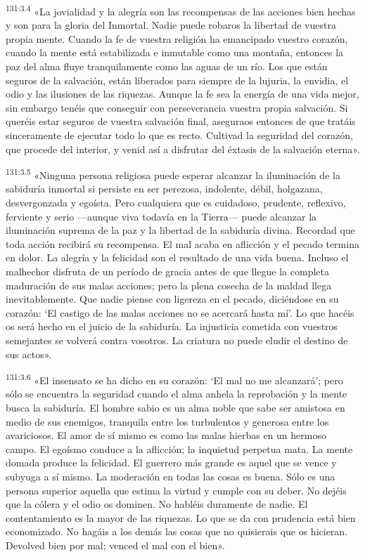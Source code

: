 \par
\textsuperscript{131:3.4} «La jovialidad y la alegría son las recompensas de las acciones bien hechas y son para la gloria del Inmortal. Nadie puede robaros la libertad de vuestra propia mente. Cuando la fe de vuestra religión ha emancipado vuestro corazón, cuando la mente está estabilizada e inmutable como una montaña, entonces la paz del alma fluye tranquilamente como las aguas de un río. Los que están seguros de la salvación, están liberados para siempre de la lujuria, la envidia, el odio y las ilusiones de las riquezas. Aunque la fe sea la energía de una vida mejor, sin embargo tenéis que conseguir con perseverancia vuestra propia salvación. Si queréis estar seguros de vuestra salvación final, aseguraos entonces de que tratáis sinceramente de ejecutar todo lo que es recto. Cultivad la seguridad del corazón, que procede del interior, y venid así a disfrutar del éxtasis de la salvación eterna».

\par
\textsuperscript{131:3.5} «Ninguna persona religiosa puede esperar alcanzar la iluminación de la sabiduría inmortal si persiste en ser perezosa, indolente, débil, holgazana, desvergonzada y egoísta. Pero cualquiera que es cuidadoso, prudente, reflexivo, ferviente y serio ---aunque viva todavía en la Tierra--- puede alcanzar la iluminación suprema de la paz y la libertad de la sabiduría divina. Recordad que toda acción recibirá su recompensa. El mal acaba en aflicción y el pecado termina en dolor. La alegría y la felicidad son el resultado de una vida buena. Incluso el malhechor disfruta de un período de gracia antes de que llegue la completa maduración de sus malas acciones; pero la plena cosecha de la maldad llega inevitablemente. Que nadie piense con ligereza en el pecado, diciéndose en su corazón: `El castigo de las malas acciones no se acercará hasta mí'. Lo que hacéis os será hecho en el juicio de la sabiduría. La injusticia cometida con vuestros semejantes se volverá contra vosotros. La criatura no puede eludir el destino de sus actos».

\par
\textsuperscript{131:3.6} «El insensato se ha dicho en su corazón: `El mal no me alcanzará'; pero sólo se encuentra la seguridad cuando el alma anhela la reprobación y la mente busca la sabiduría. El hombre sabio es un alma noble que sabe ser amistosa en medio de sus enemigos, tranquila entre los turbulentos y generosa entre los avariciosos. El amor de sí mismo es como las malas hierbas en un hermoso campo. El egoísmo conduce a la aflicción; la inquietud perpetua mata. La mente domada produce la felicidad. El guerrero más grande es aquel que se vence y subyuga a sí mismo. La moderación en todas las cosas es buena. Sólo es una persona superior aquella que estima la virtud y cumple con su deber. No dejéis que la cólera y el odio os dominen. No habléis duramente de nadie. El contentamiento es la mayor de las riquezas. Lo que se da con prudencia está bien economizado. No hagáis a los demás las cosas que no quisierais que os hicieran. Devolved bien por mal; venced el mal con el bien».

